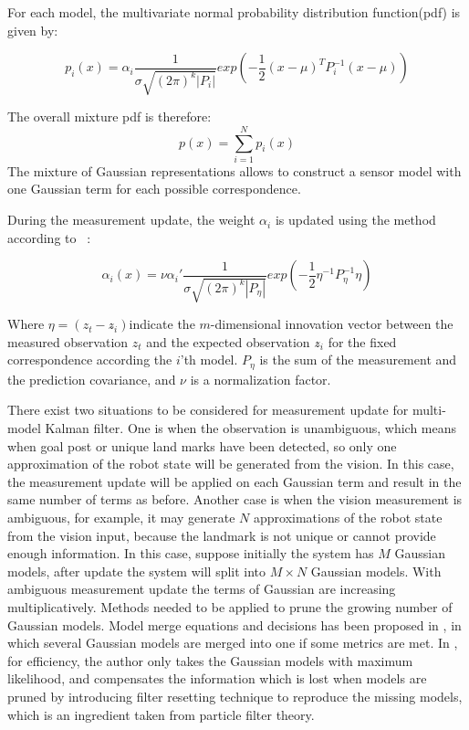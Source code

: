 For each model, the multivariate normal probability distribution function(pdf) is given by:

$$p_{i}(x) = \alpha_i\frac{1}{\sigma \sqrt {(2\pi)^k|P_i|}}exp(-\frac{1}{2}(x-\mu)^TP_i^{-1}(x-\mu))$$

The overall mixture pdf is therefore:
$$p(x) = \sum_{i=1}^{N}p_i(x)$$
The mixture of Gaussian representations allows to construct a sensor model with one Gaussian term for each possible correspondence.

During the measurement update, the weight $\alpha_i$ is updated using the method according to ~\cite{alspach1972nonlinear}:

$$\alpha_{i}(x) = \nu\alpha_i'\frac{1}{\sigma \sqrt {(2\pi)^k|P_\eta|}}exp(-\frac{1}{2}\eta^{-1}P_\eta^{-1}\eta)$$

Where $\eta = (z_t - z\widehat{}_i)$indicate the $m$-dimensional innovation vector between the measured observation $z_t$ and the expected observation $z\widehat{}_i$ for the fixed correspondence according the $i$'th model. $P_\eta$ is the sum of the measurement and the prediction covariance, and $\nu$ is a normalization factor.

There exist two situations to be considered for measurement update for multi-model Kalman filter. One is when the observation is unambiguous, which means when goal post or unique land marks have been detected, so only one approximation of the robot state will be generated from the vision. In this case, the measurement update will be applied on each Gaussian term and result in the same number of terms as before. Another case is when the vision measurement is ambiguous, for example, it may generate $N$ approximations of the robot state from the vision input, because the landmark is not unique or cannot provide enough information. In this case, suppose initially the system has $M$ Gaussian models, after update the system will split into $M \times N$ Gaussian models. With ambiguous measurement update the terms of Gaussian are increasing multiplicatively. Methods needed to be applied to prune the growing number of Gaussian models. Model merge equations and decisions has been proposed in \cite{Quinlan2010}, in which several Gaussian models are merged into one if some metrics are met. In \cite{Jochmann2012}, for efficiency, the author only takes the Gaussian models with maximum likelihood, and compensates the information which is lost when models are pruned by introducing filter resetting technique to reproduce the missing models, which is an ingredient taken from particle filter theory.

